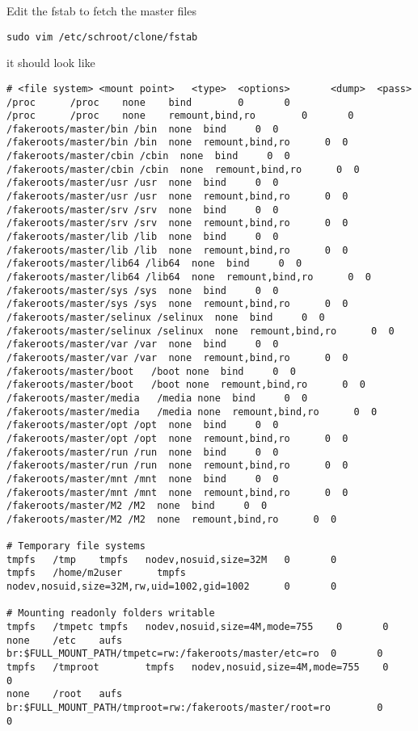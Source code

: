 \documentclass[a4paper]{book}
\begin{document}
Edit the fstab to fetch the master files

\begin{verbatim}
sudo vim /etc/schroot/clone/fstab
\end{verbatim}

it should look like

\begin{verbatim}
# <file system> <mount point>   <type>  <options>       <dump>  <pass>
/proc      /proc    none    bind        0       0
/proc      /proc    none    remount,bind,ro        0       0
/fakeroots/master/bin /bin  none  bind     0  0
/fakeroots/master/bin /bin  none  remount,bind,ro      0  0
/fakeroots/master/cbin /cbin  none  bind     0  0
/fakeroots/master/cbin /cbin  none  remount,bind,ro      0  0
/fakeroots/master/usr /usr  none  bind     0  0
/fakeroots/master/usr /usr  none  remount,bind,ro      0  0
/fakeroots/master/srv /srv  none  bind     0  0
/fakeroots/master/srv /srv  none  remount,bind,ro      0  0
/fakeroots/master/lib /lib  none  bind     0  0
/fakeroots/master/lib /lib  none  remount,bind,ro      0  0
/fakeroots/master/lib64 /lib64  none  bind     0  0
/fakeroots/master/lib64 /lib64  none  remount,bind,ro      0  0
/fakeroots/master/sys /sys  none  bind     0  0
/fakeroots/master/sys /sys  none  remount,bind,ro      0  0
/fakeroots/master/selinux /selinux  none  bind     0  0
/fakeroots/master/selinux /selinux  none  remount,bind,ro      0  0
/fakeroots/master/var /var  none  bind     0  0
/fakeroots/master/var /var  none  remount,bind,ro      0  0
/fakeroots/master/boot   /boot none  bind     0  0
/fakeroots/master/boot   /boot none  remount,bind,ro      0  0
/fakeroots/master/media   /media none  bind     0  0
/fakeroots/master/media   /media none  remount,bind,ro      0  0
/fakeroots/master/opt /opt  none  bind     0  0
/fakeroots/master/opt /opt  none  remount,bind,ro      0  0
/fakeroots/master/run /run  none  bind     0  0
/fakeroots/master/run /run  none  remount,bind,ro      0  0
/fakeroots/master/mnt /mnt  none  bind     0  0
/fakeroots/master/mnt /mnt  none  remount,bind,ro      0  0
/fakeroots/master/M2 /M2  none  bind     0  0
/fakeroots/master/M2 /M2  none  remount,bind,ro      0  0

# Temporary file systems
tmpfs   /tmp    tmpfs   nodev,nosuid,size=32M   0       0
tmpfs   /home/m2user      tmpfs   nodev,nosuid,size=32M,rw,uid=1002,gid=1002      0       0

# Mounting readonly folders writable
tmpfs   /tmpetc tmpfs   nodev,nosuid,size=4M,mode=755    0       0
none    /etc    aufs    br:$FULL_MOUNT_PATH/tmpetc=rw:/fakeroots/master/etc=ro  0       0
tmpfs   /tmproot        tmpfs   nodev,nosuid,size=4M,mode=755    0       0
none    /root   aufs    br:$FULL_MOUNT_PATH/tmproot=rw:/fakeroots/master/root=ro        0       0
\end{verbatim}
\end{document}
